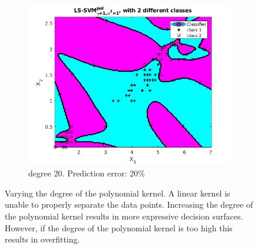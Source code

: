 \documentclass{article}
\begin{document}
\begin{figure}[]
\begin{subfigure}{0.33\linewidth}
            \includegraphics[width=\linewidth]{iris_degree_20}
            \caption{degree 20.
Prediction error: 20\%}
        \end{subfigure}
   
        
	
        \caption{ Varying the degree of the polynomial kernel. A linear kernel is unable to properly separate the data points. Increasing the degree of the polynomial kernel results in more expressive decision surfaces. However, if the degree of the polynomial kernel is too high this results in overfitting.}        
        \label{fig:iris}
    \end{figure}
    
   
\end{document}
